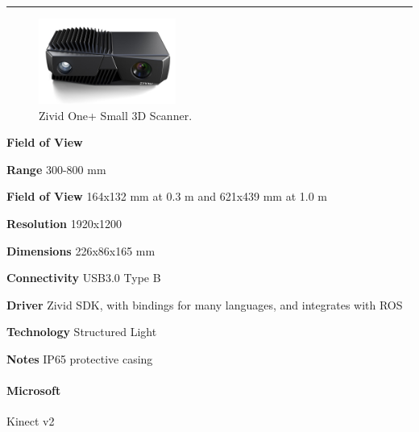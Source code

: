\documentclass[../main.tex]{subfiles}
\begin{document}
\noindent\rule{8cm}{0.1pt}
\begin{figure}[H]
    \centering
    \includegraphics[width=0.4\textwidth]{images/ZividOneSmall.jpg}
    \caption{Zivid One+ Small 3D Scanner.}
    \label{fig:ZividOneSmall}
\end{figure}
\begin{labeling}{\textbf{Field of View    }}
    \setlength{\itemindent}{2em}
    \item [\textbf{Range}] 300-800 mm 
    \item [\textbf{Field of View}] 164x132 mm at 0.3 m and 621x439 mm at 1.0 m
    \item [\textbf{Resolution}] 1920x1200
    \item [\textbf{Dimensions}] 226x86x165 mm
    \item [\textbf{Connectivity}] USB3.0 Type B
    \item [\textbf{Driver}] Zivid SDK, with bindings for many languages, and integrates with ROS
    \item [\textbf{Technology}] Structured Light
    \item [\textbf{Notes}] IP65 protective casing
\end{labeling}
\vspace{1em}
\paragraph{\large \textbf{Microsoft}} {\large Kinect v2}
\end{document}
